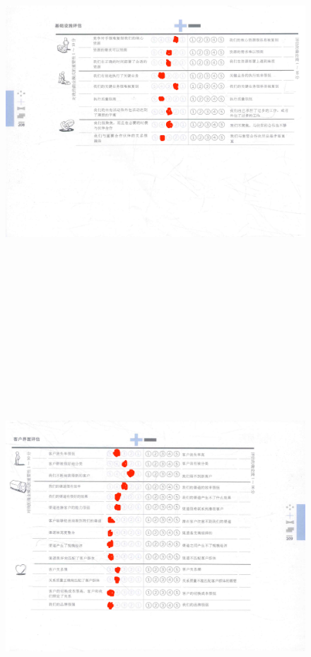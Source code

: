 \documentclass[a4paper,12pt]{article}
\begin{document}
    \begin{figure}[htbp]
        \centering
        \includegraphics[width=15cm,height=15cm]{png/S&W2}
    \end{figure}
   
    \begin{figure}[htbp]
        \centering
        \includegraphics[width=20cm,height=15cm]{png/S&W3}
    \end{figure}
    \clearpage %
\end{document}
